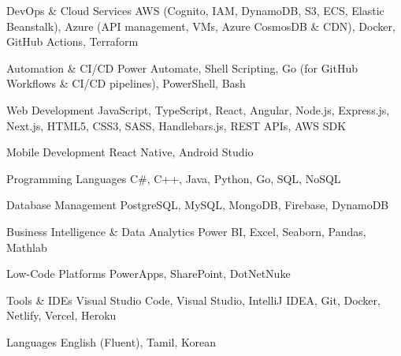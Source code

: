 
\begin{cvskills}

  \cvskill
    {DevOps \& Cloud Services} %
    {AWS (Cognito, IAM, DynamoDB, S3, ECS, Elastic Beanstalk), Azure (API management, VMs, Azure CosmosDB \& CDN), Docker, GitHub Actions, Terraform} %

  \cvskill
    {Automation \& CI/CD} %
    {Power Automate, Shell Scripting, Go (for GitHub Workflows \& CI/CD pipelines), PowerShell, Bash} %

  \cvskill
    {Web Development} %
    {JavaScript, TypeScript, React, Angular, Node.js, Express.js, Next.js, HTML5, CSS3, SASS, Handlebars.js, REST APIs, AWS SDK} %

  \cvskill
    {Mobile Development} %
    {React Native, Android Studio} %

  \cvskill
    {Programming Languages} %
    {C\#, C++, Java, Python, Go, SQL, NoSQL} %

  \cvskill
    {Database Management} %
    {PostgreSQL, MySQL, MongoDB, Firebase, DynamoDB} %

  \cvskill
    {Business Intelligence \& Data Analytics} %
    {Power BI, Excel, Seaborn, Pandas, Mathlab} %

  \cvskill
    {Low-Code Platforms} %
    {PowerApps, SharePoint, DotNetNuke} %

  \cvskill
    {Tools \& IDEs} %
    {Visual Studio Code, Visual Studio, IntelliJ IDEA, Git, Docker, Netlify, Vercel, Heroku} %

  \cvskill
    {Languages} %
    {English (Fluent), Tamil, Korean} %

\end{cvskills}
